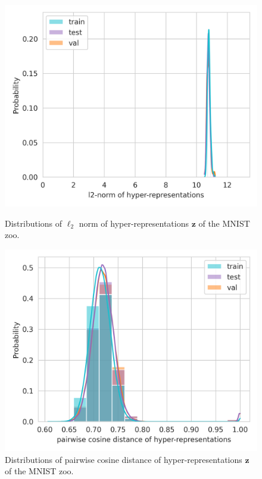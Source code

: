 \begin{figure}[ht!]
\begin{minipage}[t]{0.49\textwidth}
\begin{center}
\includegraphics[trim=0in 0in 0in 0in, clip, width=0.9\linewidth]{figures/hyper_representations_l2norm.png}
\vskip -0.1in
\caption{Distributions of $\ell_2$ norm of hyper-representations $\mathbf{z}$ of the MNIST zoo.}
\label{fig:hyper_sphere_z}    
\end{center}
\end{minipage}
\hskip 0.2cm
\begin{minipage}[t]{0.49\textwidth}
\begin{center}
\includegraphics[trim=0in 0in 0in 0in, clip, width=0.9\linewidth]{figures/hyper_representations_cosine_distance.png}
\vskip -0.1in
\caption{Distributions of pairwise cosine distance of hyper-representations $\mathbf{z}$ of the MNIST zoo.}
\label{fig:hyper_sphere_cos}    
\end{center}
\end{minipage}
\end{figure}

